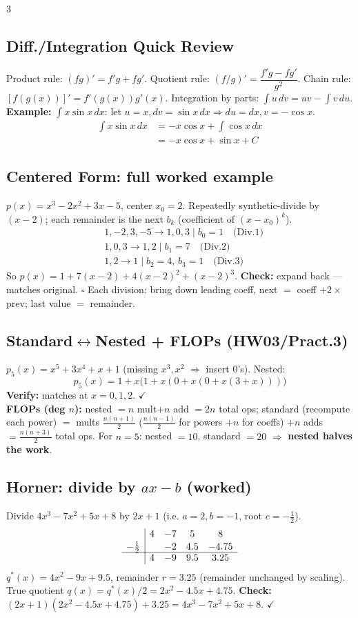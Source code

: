 \documentclass[9pt]{extarticle}
\newcommand{\hl}[1]{\textbf{\textcolor{BrickRed}{#1}}}
\begin{document}
\begin{multicols}{3}
\subsection{Diff./Integration Quick Review}
Product rule: $(fg)'=f'g+fg'$. Quotient rule: $(f/g)'=\dfrac{f'g-fg'}{g^2}$.
Chain rule: $[f(g(x))]'=f'(g(x))g'(x)$.
Integration by parts: $\displaystyle\int u\,dv=uv-\int v\,du$.
\textbf{Example:} $\int x\sin x\,dx$: let $u=x,dv=\sin x\,dx\Rightarrow du=dx,v=-\cos x$.
\begin{align*}
\int x\sin x\,dx&=-x\cos x+\int\cos x\,dx\\
&=-x\cos x+\sin x+C
\end{align*}

\subsection{Centered Form: full worked example}
$p(x)=x^3-2x^2+3x-5$, center $x_0=2$. Repeatedly synthetic-divide by $(x-2)$; each remainder is the next $b_k$ (coefficient of $(x-x_0)^k$).
\begin{align*}
&1,{-}2,3,{-}5 \to 1,0,3\mid b_0{=}1\quad\text{(Div.1)}\\
&1,0,3 \to 1,2\mid b_1{=}7\quad\text{(Div.2)}\\
&1,2 \to 1\mid b_2{=}4,\,b_3{=}1\quad\text{(Div.3)}
\end{align*}
So $p(x)=1+7(x-2)+4(x-2)^2+(x-2)^3$. \textbf{Check:} expand back — matches original. $\square$ Each division: bring down leading coeff, next $=$ coeff $+2\times$prev; last value $=$ remainder.

\subsection{Standard$\leftrightarrow$Nested + FLOPs (HW03/Pract.3)}
$p_5(x)=x^5+3x^4+x+1$ (missing $x^3,x^2$ $\Rightarrow$ insert $0$'s). Nested:
\begin{equation*}
p_5(x)=1+x\big(1+x(0+x(0+x(3+x)))\big)
\end{equation*}
\hl{Verify:} matches at $x=0,1,2$. $\checkmark$ \\
\hl{FLOPs (deg $n$):} nested $=n$ mult$+n$ add $=2n$ total ops; standard (recompute each power) $=$ mults $\tfrac{n(n+1)}{2}$ ($\tfrac{n(n-1)}{2}$ for powers $+n$ for coeffs) $+n$ adds $=\tfrac{n(n+3)}{2}$ total ops. For $n{=}5$: nested $=10$, standard $=20$ $\Rightarrow$ \hl{nested halves the work}.

\subsection{Horner: divide by $ax-b$ (worked)}
Divide $4x^3-7x^2+5x+8$ by $2x+1$ (i.e. $a=2,b=-1$, root $c=-\tfrac12$).
\[
\begin{array}{c|cccc}
 & 4 & -7 & 5 & 8\\[1pt]
-\frac12 & & -2 & 4.5 & -4.75\\[-1pt]
\hline
 & 4 & -9 & 9.5 & 3.25
\end{array}
\]
$q^*(x)=4x^2-9x+9.5$, remainder $r=3.25$ (remainder unchanged by scaling). True quotient $q(x)=q^*(x)/2=2x^2-4.5x+4.75$.
\textbf{Check:} $(2x+1)(2x^2-4.5x+4.75)+3.25=4x^3-7x^2+5x+8$. $\checkmark$


\end{multicols}
\end{document}
